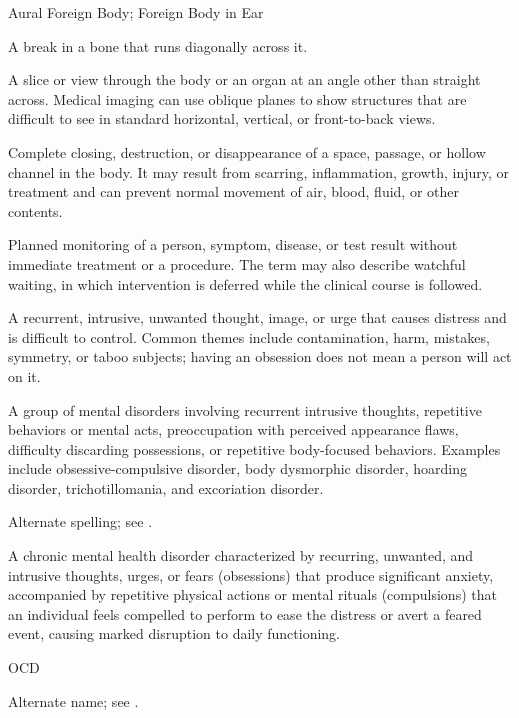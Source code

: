 \synonyms
Aural Foreign Body; Foreign Body in Ear

 A break in a bone that runs diagonally across it.

 A slice or view through the body or an organ at an angle other than straight across. Medical imaging can use oblique planes to show structures that are difficult to see in standard horizontal, vertical, or front-to-back views.

 Complete closing, destruction, or disappearance of a space, passage, or hollow channel in the body. It may result from scarring, inflammation, growth, injury, or treatment and can prevent normal movement of air, blood, fluid, or other contents.

 Planned monitoring of a person, symptom, disease, or test result without immediate treatment or a procedure. The term may also describe watchful waiting, in which intervention is deferred while the clinical course is followed.

 A recurrent, intrusive, unwanted thought, image, or urge that causes distress and is difficult to control. Common themes include contamination, harm, mistakes, symmetry, or taboo subjects; having an obsession does not mean a person will act on it.

 A group of mental disorders involving recurrent intrusive thoughts, repetitive behaviors or mental acts, preoccupation with perceived appearance flaws, difficulty discarding possessions, or repetitive body-focused behaviors. Examples include obsessive-compulsive disorder, body dysmorphic disorder, hoarding disorder, trichotillomania, and excoriation disorder.

 Alternate spelling; see .

 A chronic mental health disorder characterized by recurring, unwanted, and intrusive thoughts, urges, or fears (obsessions) that produce significant anxiety, accompanied by repetitive physical actions or mental rituals (compulsions) that an individual feels compelled to perform to ease the distress or avert a feared event, causing marked disruption to daily functioning.

\synonyms
OCD

 Alternate name; see .

